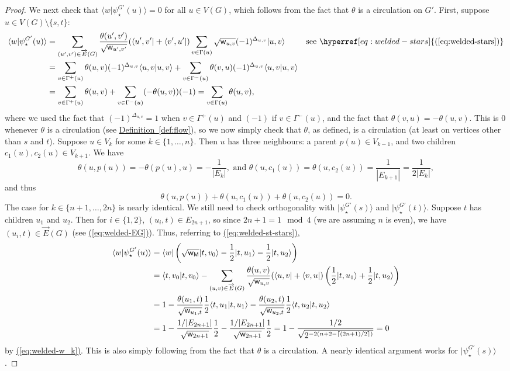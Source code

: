 \documentclass{theoretics}
\newcommand{\eq}[1]{\hyperref[eq:#1]{(\ref*{eq:#1})}}
\newcommand{\defin}[1]{\hyperref[def:#1]{Definition~\ref*{def:#1}}}
\def\ket#1{{\lvert}#1\rangle}
\def\bra#1{{\langle}#1\rvert}
\renewcommand{\>}{\rangle}
\newcommand{\<}{\langle}
\renewcommand{\(}{\left(}
\renewcommand{\)}{\right)}
\def\braket#1#2{{{\langle}#1\vert}#2\rangle}
\def\w{{\sf w}}
\begin{document}
\begin{proof}
We next check that $\braket{w}{\psi_\star^{G'}(u)}=0$ for all $u\in V(G)$, which follows from the fact that $\theta$ is a circulation on $G'$. First, suppose $u\in V(G)\setminus\{s,t\}$:
\begin{align*}
\braket{w}{\psi_\star^{G'}(u)}&=\sum_{(u',v')\in \overrightarrow{E}(G)}\frac{\theta(u',v')}{\sqrt{\w_{u',v'}}}(\bra{u',v'}+\bra{v',u'})\sum_{v\in\Gamma(u)}\sqrt{\w_{u,v}}(-1)^{\Delta_{u,v}}\ket{u,v} & \mbox{see }\eq{welded-stars}\\
&= \sum_{v\in \Gamma^+(u)}\theta(u,v)(-1)^{\Delta_{u,v}}\braket{u,v}{u,v}+\sum_{v\in\Gamma^-(u)}\theta(v,u)(-1)^{\Delta_{u,v}}\braket{u,v}{u,v}\\
&=\sum_{v\in\Gamma^+(u)}\theta(u,v) +\sum_{v\in\Gamma^-(u)}(-\theta(u,v))(-1) = \sum_{v\in \Gamma(u)}\theta(u,v),
\end{align*}
where we used the fact that $(-1)^{\Delta_{u,v}}=1$ when $v\in\Gamma^+(u)$ and $(-1)$ if $v\in\Gamma^-(u)$, and the fact that $\theta(v,u)=-\theta(u,v)$. This is 0 whenever $\theta$ is a circulation (see \defin{flow}), so we now simply check that $\theta$, as defined, is a circulation (at least on vertices other than $s$ and $t$). Suppose $u\in V_k$ for some $k\in\{1,\dots,n\}$. Then $u$ has three neighbours: a parent $p(u)\in V_{k-1}$, and two children $c_1(u),c_2(u)\in V_{k+1}$. We have 
$$\theta(u,p(u))= -\theta(p(u),u) = -\frac{1}{|E_k|},
\mbox{ and }
\theta(u,c_1(u))=\theta(u,c_2(u)) = \frac{1}{|E_{k+1}|} = \frac{1}{2|E_k|},$$
and thus
$$\theta(u,p(u))+\theta(u,c_1(u))+\theta(u,c_2(u)) = 0.$$
The case for $k\in\{n+1,\dots,2n\}$ is nearly identical. We still need to check orthogonality with $\ket{\psi_\star^{G'}(s)}$ and $\ket{\psi_\star^{G'}(t)}$. Suppose $t$ has children $u_1$ and $u_2$. Then for $i\in\{1,2\}$, $(u_i,t)\in E_{2n+1}$, so since $2n+1=1\mod 4$ (we are assuming $n$ is even), we have $(u_i,t)\in \overrightarrow{E}(G)$ (see \eq{welded-EG}). Thus, referring to \eq{welded-st-stars}, 
\begin{align*}
\braket{w}{\psi_\star^{G'}(u)}&=\bra{w}\left(\sqrt{\w_{\sf M}}\ket{t,v_0} - \frac{1}{2}\ket{t,u_1} - \frac{1}{2}\ket{t,u_2} \right) \\
&=\braket{t,v_0}{t,v_0}-\sum_{(u,v)\in \overrightarrow{E}(G)}\frac{\theta(u,v)}{\sqrt{\w_{u,v}}}(\bra{u,v}+\bra{v,u})\left(\frac{1}{2}\ket{t,u_1}+\frac{1}{2}\ket{t,u_2} \right)\\
&= 1-\frac{\theta(u_1,t)}{\sqrt{\w_{u_1,t}}}\frac{1}{2}\braket{t,u_1}{t,u_1}-\frac{\theta(u_2,t)}{\sqrt{\w_{u_2,t}}}\frac{1}{2}\braket{t,u_2}{t,u_2}\\
&= 1-\frac{1/|E_{2n+1}|}{\sqrt{\w_{2n+1}}}\frac{1}{2} - \frac{1/|E_{2n+1}|}{\sqrt{\w_{2n+1}}}\frac{1}{2}
= 1 - \frac{1/2}{\sqrt{2^{-2(n+2-\lceil (2n+1)/2\rceil)}}} = 0
\end{align*}
by \eq{welded-w_k}.
This is also simply following from the fact that $\theta$ is a circulation. 
A nearly identical argument works for $\ket{\psi_\star^{G'}(s)}$. 


\end{proof}
\end{document}
